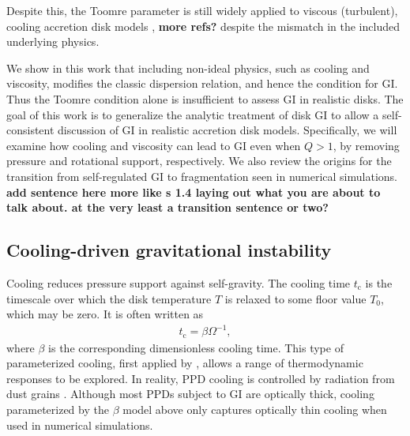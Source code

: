 \documentclass[iop, numberedappendix]{emulateapj}
\newcommand{\p}{\partial}
\newcommand{\tcool}{t_\mathrm{c}}
\begin{document}
Despite this, the Toomre parameter %
 is still widely applied to viscous (turbulent), cooling
accretion disk models \citep[e.g.][]{gammie01,cossins09, kimura12}, {\bf more refs?}
despite the mismatch in the included underlying physics.

We show in this work that including non-ideal
physics, such as cooling and viscosity, modifies the classic dispersion
relation, and hence the condition for GI. Thus the Toomre condition
alone is insufficient to assess GI in realistic disks.  The goal of
this work is to generalize the analytic treatment of disk GI to allow
a self-consistent discussion of GI in realistic accretion disk
models. Specifically, we will examine how  cooling and viscosity can
lead to GI even when $Q>1$, by removing pressure and rotational
support, respectively.  We also review the origins for the transition from self-regulated GI 
to fragmentation seen in numerical simulations. {\bf add sentence here more like s 1.4 laying
out what you are about to talk about. at the very least a transition sentence or two?}


\subsection{Cooling-driven gravitational instability}\label{cool_gi}
Cooling reduces pressure support against self-gravity. The
cooling time  
$\tcool$ is the timescale over which the disk temperature $T$ is relaxed
to some floor value $T_0$, which may be zero. 
 It is often written as 
\begin{align} \label{beta_def}
  \tcool = \beta \Omega^{-1},
\end{align}
where $\beta$ is the corresponding dimensionless cooling time. This
type of parameterized cooling, first applied by \cite{gammie01},
allows a range of thermodynamic responses to be explored. In reality, PPD cooling is controlled by radiation 
from dust grains \citep{bell94,dalessio97,chiang97}. Although most PPDs subject to GI are optically thick, 
cooling parameterized by the $\beta$ model above only captures optically thin cooling when used in numerical
simulations.
\end{document}
